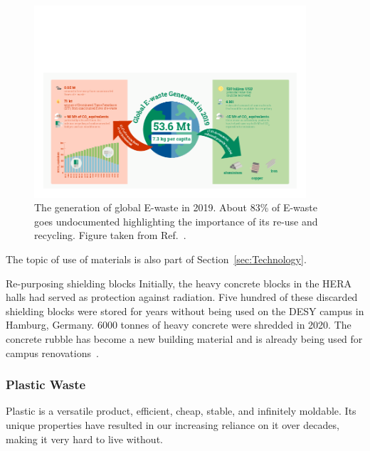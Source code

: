 \documentclass[../SustainableHEP.tex]{subfiles}
\begin{document}
\begin{figure}
    \centering
    \includegraphics[width=0.9\textwidth]{Sections/Figs/Waste/EWaste-1.png}
    \caption{The generation of global E-waste in 2019. About 83\% of E-waste goes undocumented highlighting the importance of its re-use and recycling. Figure taken from Ref.~\cite{EWaste}.\label{fig:ewaste}}
\end{figure}

The topic of use of materials is also part of Section~\ref{sec:Technology}.


\begin{bestpractice}{Re-purposing shielding blocks}
Initially, the heavy concrete blocks in the HERA halls had served
as protection against radiation. Five hundred of these discarded shielding blocks were stored for years without being used on the DESY campus in Hamburg, Germany. 6000 tonnes of heavy concrete were shredded in 2020. The concrete rubble has become a new building material and is already being used for campus renovations~\cite{DESYsustainableReport2022}.
\end{bestpractice}

\subsubsection{Plastic Waste}
Plastic is a versatile product, efficient, cheap, stable, and infinitely moldable.  Its unique properties have resulted in our increasing reliance on it over decades, making it very hard to live without. 
\end{document}
